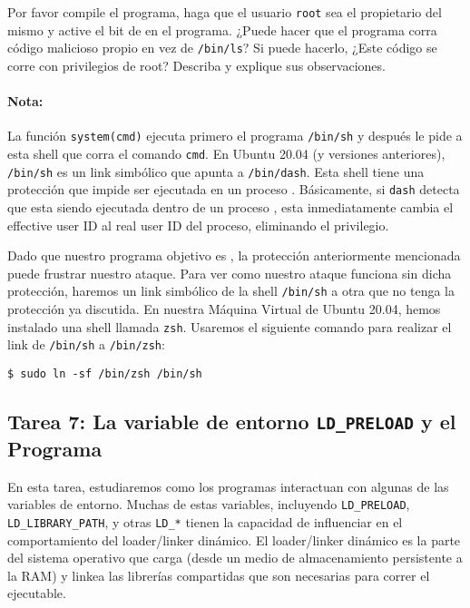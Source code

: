 Por favor compile el programa, haga que el usuario  {\tt root} sea el propietario del mismo y active el bit de \setuid en el programa. ¿Puede hacer que el programa \setuid corra código malicioso propio en vez de {\tt /bin/ls}? Si puede hacerlo, ¿Este código se corre con privilegios de root?
Describa y explique sus observaciones.


\paragraph{Nota:}
La función \texttt{system(cmd)} ejecuta primero el programa \texttt{/bin/sh} y después le pide a esta shell que corra el comando \texttt{cmd}.
En Ubuntu 20.04 (y versiones anteriores), \texttt{/bin/sh} es un link simbólico que apunta a \texttt{/bin/dash}.
Esta shell tiene una protección que impide ser ejecutada en un proceso \setuid. Básicamente, si \texttt{dash} detecta que esta siendo ejecutada dentro de un proceso \setuid, esta inmediatamente cambia el effective user ID al real user ID del proceso, eliminando el privilegio.

Dado que nuestro programa objetivo es \setuid, la protección anteriormente mencionada puede frustrar nuestro ataque.
Para ver como nuestro ataque funciona sin dicha protección, haremos un link simbólico de la shell \texttt{/bin/sh} a otra que no tenga la protección ya discutida. En nuestra Máquina Virtual de Ubuntu 20.04, hemos instalado una shell llamada \texttt{zsh}. Usaremos el siguiente comando para realizar el link de \texttt{/bin/sh} a \texttt{/bin/zsh}:


\begin{lstlisting}
$ sudo ln -sf /bin/zsh /bin/sh
\end{lstlisting}


\subsection{Tarea 7: La variable de entorno {\tt LD\_PRELOAD} y el Programa \setuid}

En esta tarea, estudiaremos como los programas \setuid interactuan con algunas de las variables de entorno.
Muchas de estas variables, incluyendo {\tt LD\_PRELOAD}, {\tt LD\_LIBRARY\_PATH}, y otras {\tt LD\_*} tienen la capacidad de influenciar en el comportamiento del loader/linker dinámico.
El loader/linker dinámico es la parte del sistema operativo que carga (desde un medio de almacenamiento persistente a la RAM) y linkea las librerías compartidas que son necesarias para correr el ejecutable.

